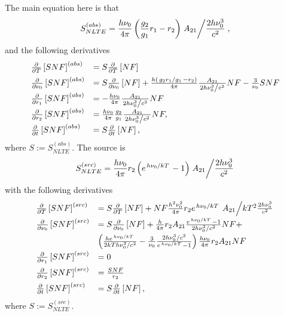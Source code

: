 The main equation here is that
\begin{equation}
  S^{(abs)}_{NLTE} = \frac{h\nu_0}{4\pi}\left(\frac{g_2}{g_1} r_1 - r_2\right) \left.A_{21}\middle/\frac{2h\nu_0^3}{c^2}\right.,
\end{equation}
and the following derivatives
\begin{equation}
 \begin{array}{ll}
  \frac{\partial}{\partial T} \left[SNF\right]^{(abs)} &= S\frac{\partial}{\partial T} \left[NF\right] \\[5pt]
  \frac{\partial}{\partial \nu_0} \left[SNF\right]^{(abs)} &= S\frac{\partial}{\partial \nu_0} \left[NF\right] + 
  \frac{h\left(\left. g_2 r_1 \middle/ g_1 \right. - r_2\right)}{4\pi} \frac{A_{21}}{\left. 2h\nu_0^3 \middle/ c^2 \right.} NF - \frac{3}{\nu_0}SNF \\[5pt]
  \frac{\partial}{\partial r_1} \left[SNF\right]^{(abs)} &= - \frac{h\nu_0}{4\pi}\frac{A_{21}}{\left. 2h\nu_0^3 \middle/ c^2 \right.} NF \\[5pt]
  \frac{\partial}{\partial r_2} \left[SNF\right]^{(abs)} &= \frac{h\nu_0}{4\pi}\frac{g_2}{g_1}\frac{A_{21}}{\left. 2h\nu_0^3 \middle/ c^2 \right.} NF,
  \\[5pt]
  \frac{\partial}{\partial t} \left[SNF\right]^{(abs)} &= S\frac{\partial}{\partial t} \left[NF\right],
 \end{array}
\end{equation}
where $S:=S^{(abs)}_{NLTE}$.  The source is
\begin{equation}
  S^{(src)}_{NLTE} = \frac{h\nu_0}{4\pi}  r_2 \left(e^{\left. h\nu_0 \middle/ kT \right.} - 1\right) \left.A_{21}\middle/\frac{2h\nu_0^3}{c^2}\right.
\end{equation}
with the following derivatives
\begin{equation}
 \begin{array}{ll}
  \frac{\partial}{\partial T} \left[SNF\right]^{(src)} &= S\frac{\partial}{\partial T} \left[NF\right] + NF \frac{h^2\nu_0^2}{4\pi}  r_2 e^{\left. h\nu_0 \middle/ kT \right.} \left.A_{21}\middle/kT^2\frac{2h\nu_0^3}{c^2}\right. \\[5pt]
  \frac{\partial}{\partial \nu_0} \left[SNF\right]^{(src)} &= S\frac{\partial}{\partial \nu_0} \left[NF\right] +
  \frac{h}{4\pi}r_2A_{21}\frac{e^{\left. h\nu_0 \middle/ kT \right.}-1}{2h\nu_0^3/c^2}NF + \\[5pt]& \left(\frac{he^{\left. h\nu_0 \middle/ kT \right.}}{2kTh\nu_0^3/c^2} - \frac{3}{\nu_0}\frac{2h\nu_0^3/c^2}{e^{\left. h\nu_0 \middle/ kT \right.} - 1}\right)  \frac{h\nu_0}{4\pi}  r_2 A_{21}NF \\[5pt]
  \frac{\partial}{\partial r_1} \left[SNF\right]^{(src)} &= 0 \\[5pt]
  \frac{\partial}{\partial r_2} \left[SNF\right]^{(src)} &= \frac{SNF}{r_2} \\[5pt]
  \frac{\partial}{\partial t} \left[SNF\right]^{(src)} &= S\frac{\partial}{\partial t} \left[NF\right],
 \end{array}
\end{equation}
where $S:=S^{(src)}_{NLTE}$.

